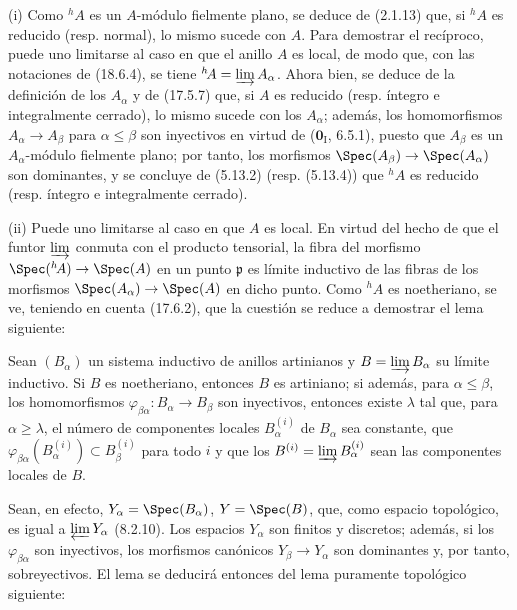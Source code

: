 
(i) Como ${}^h\!A$ es un $A$-módulo fielmente plano, se deduce de (2.1.13) que, si ${}^h\!A$ es reducido (resp. normal), lo mismo sucede con $A$. Para demostrar el recíproco, puede uno limitarse al caso en que el anillo $A$ es local, de modo que, con las notaciones de (18.6.4), se tiene ${}^h\!A=\varinjlim A_\alpha$. Ahora bien, se deduce de la definición de los $A_\alpha$ y de (17.5.7) que, si $A$ es reducido (resp. íntegro e integralmente cerrado), lo mismo sucede con los $A_\alpha$; además, los homomorfismos $A_\alpha\to A_\beta$ para $\alpha\leq\beta$ son inyectivos en virtud de ($\mathbf{0}_{\mathrm I}$, 6.5.1), puesto que $A_\beta$ es un $A_\alpha$-módulo fielmente plano; por tanto, los morfismos $\Spec(A_\beta)\to\Spec(A_\alpha)$ son dominantes, y se concluye de (5.13.2) (resp. (5.13.4)) que ${}^h\!A$ es reducido (resp. íntegro e integralmente cerrado).

(ii) Puede uno limitarse al caso en que $A$ es local. En virtud del hecho de que el funtor $\varinjlim$ conmuta con el producto tensorial, la fibra del morfismo $\Spec({}^h\!A)\to\Spec(A)$ en un punto $\mathfrak p$ es límite inductivo de las fibras de los morfismos $\Spec(A_\alpha)\to\Spec(A)$ en dicho punto. Como ${}^h\!A$ es noetheriano, se ve, teniendo en cuenta (17.6.2), que la cuestión se reduce a demostrar el lema siguiente:

\begin{lemma}[18.6.9.1]
\label{IV.18.6.9.1}
Sean $(B_\alpha)$ un sistema inductivo de anillos artinianos y $B=\varinjlim B_\alpha$ su límite inductivo. Si $B$ es noetheriano, entonces $B$ es artiniano; si además, para $\alpha\leq\beta$, los homomorfismos $\varphi_{\beta\alpha}:B_\alpha\to B_\beta$ son inyectivos, entonces existe $\lambda$ tal que, para $\alpha\geq\lambda$, el número de componentes locales $B_\alpha^{(i)}$ de $B_\alpha$ sea constante, que $\varphi_{\beta\alpha}(B_\alpha^{(i)})\subset B_\beta^{(i)}$ para todo $i$ y que los $B^{(i)}=\varinjlim B_\alpha^{(i)}$ sean las componentes locales de $B$.
\end{lemma}

Sean, en efecto, $Y_\alpha=\Spec(B_\alpha)$, $Y=\Spec(B)$, que, como espacio topológico, es igual a $\varprojlim Y_\alpha$ (8.2.10). Los espacios $Y_\alpha$ son finitos y discretos; además, si los $\varphi_{\beta\alpha}$ son inyectivos, los morfismos canónicos $Y_\beta\to Y_\alpha$ son dominantes y, por tanto, sobreyectivos. El lema se deducirá entonces del lema puramente topológico siguiente:

